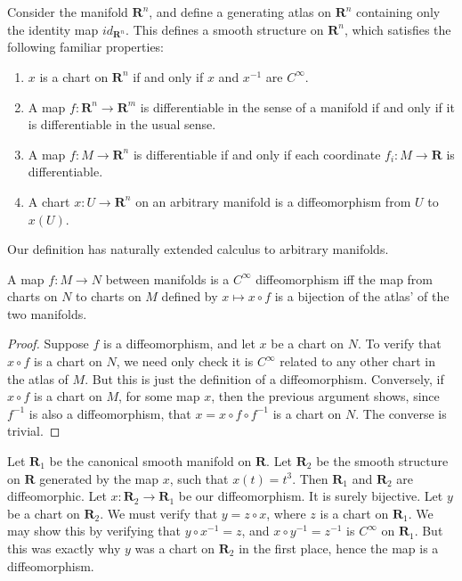 \begin{example}
    Consider the manifold $\mathbf{R}^n$, and define a generating atlas on $\mathbf{R}^n$ containing only the identity map $id_{\mathbf{R}^n}$. This defines a smooth structure on $\mathbf{R}^n$, which satisfies the following familiar properties:
    \begin{enumerate}
        \item $x$ is a chart on $\mathbf{R}^n$ if and only if $x$ and $x^{-1}$ are $C^\infty$.
        \item A map $f:\mathbf{R}^n \to \mathbf{R}^m$ is differentiable in the sense of a manifold if and only if it is differentiable in the usual sense.
        \item A map $f:M \to \mathbf{R}^n$ is differentiable if and only if each coordinate $f_i:M \to \mathbf{R}$ is differentiable.
        \item A chart $x:U \to \mathbf{R}^n$ on an arbitrary manifold is a diffeomorphism from $U$ to $x(U)$.
    \end{enumerate}
    Our definition has naturally extended calculus to arbitrary manifolds.
\end{example}

\begin{theorem}
    A map $f:M \to N$ between manifolds is a $C^\infty$ diffeomorphism iff the map from charts on $N$ to charts on $M$ defined by $x \mapsto x \circ f$ is a bijection of the atlas' of the two manifolds.
\end{theorem}
\begin{proof}
    Suppose $f$ is a diffeomorphism, and let $x$ be a chart on $N$. To verify that $x \circ f$ is a chart on $N$, we need only check it is $C^\infty$ related to any other chart in the atlas of $M$. But this is just the definition of a diffeomorphism. Conversely, if $x \circ f$ is a chart on $M$, for some map $x$, then the previous argument shows, since $f^{-1}$ is also a diffeomorphism, that $x = x \circ f \circ f^{-1}$ is a chart on $N$. The converse is trivial.
\end{proof}

\begin{example}
    Let $\mathbf{R}_1$ be the canonical smooth manifold on $\mathbf{R}$. Let $\mathbf{R}_2$ be the smooth structure on $\mathbf{R}$ generated by the map $x$, such that $x(t) = t^3$. Then $\mathbf{R}_1$ and $\mathbf{R}_2$ are diffeomorphic. Let $x:\mathbf{R}_2 \to \mathbf{R}_1$ be our diffeomorphism. It is surely bijective. Let $y$ be a chart on $\mathbf{R}_2$. We must verify that $y = z \circ x$, where $z$ is a chart on $\mathbf{R}_1$. We may show this by verifying that $y \circ x^{-1} = z$, and $x \circ y^{-1} = z^{-1}$ is $C^\infty$ on $\mathbf{R}_1$. But this was exactly why $y$ was a chart on $\mathbf{R}_2$ in the first place, hence the map is a diffeomorphism.
\end{example}

